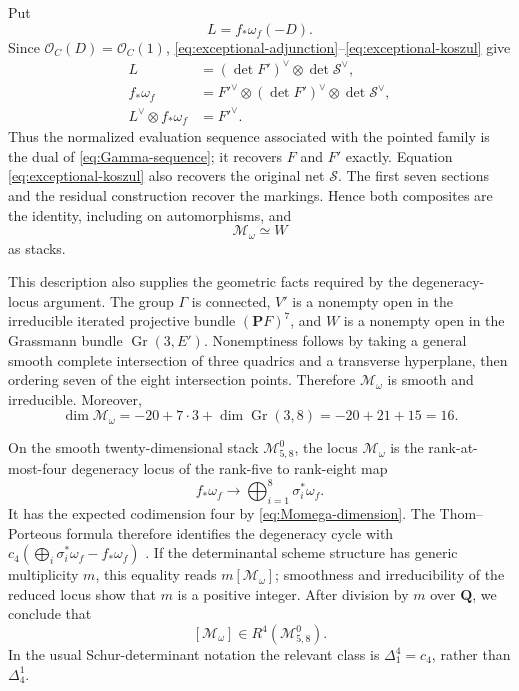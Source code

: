 \documentclass[12pt,reqno]{amsart}
\newcommand{\Q}{\mathbf{Q}}
\newcommand{\M}{\mathcal{M}}
\theoremstyle{definition}
\theoremstyle{remark}
\begin{document}
Put
\begin{equation}\label{eq:exceptional-L}
 L=f_*\omega_f(-D).
\end{equation}
Since $\mathcal O_C(D)=\mathcal O_C(1)$,
\eqref{eq:exceptional-adjunction}--\eqref{eq:exceptional-koszul} give
\begin{equation}\label{eq:exceptional-roundtrip}
 \begin{split}
 L&=(\det F')^\vee\otimes\det\mathcal S^\vee,\\
 f_*\omega_f&=F'^\vee\otimes
 (\det F')^\vee\otimes\det\mathcal S^\vee,\\
 L^\vee\otimes f_*\omega_f&=F'^\vee.
 \end{split}
\end{equation}
Thus the normalized evaluation sequence associated with the pointed family is
the dual of \eqref{eq:Gamma-sequence}; it recovers $F$ and $F'$ exactly.
Equation \eqref{eq:exceptional-koszul} also recovers the original net
$\mathcal S$.  The first seven sections and the residual construction recover
the markings.  Hence both composites are the identity, including on
automorphisms, and
\begin{equation}\label{eq:Momega-W}
 \M_\omega\simeq W
\end{equation}
as stacks.

This description also supplies the geometric facts required by the
degeneracy-locus argument.  The group $\Gamma$ is connected, $V'$ is a
nonempty open in the irreducible iterated projective bundle $(\mathbf P F)^7$,
and $W$ is a nonempty open in the Grassmann bundle
$\operatorname{Gr}(3,E')$.  Nonemptiness follows by taking a general smooth
complete intersection of three quadrics and a transverse hyperplane, then
ordering seven of the eight intersection points.  Therefore $\M_\omega$ is
smooth and irreducible.  Moreover,
\begin{equation}\label{eq:Momega-dimension}
 \dim\M_\omega=-20+7\cdot3+\dim\operatorname{Gr}(3,8)
 =-20+21+15=16.
\end{equation}

On the smooth twenty-dimensional stack $\M^0_{5,8}$, the locus
$\M_\omega$ is the rank-at-most-four degeneracy locus of the rank-five to
rank-eight map
\begin{equation}\label{eq:Momega-degeneracy}
 f_*\omega_f\longrightarrow\bigoplus_{i=1}^8\sigma_i^*\omega_f.
\end{equation}
It has the expected codimension four by \eqref{eq:Momega-dimension}.
The Thom--Porteous formula therefore identifies the degeneracy cycle with
$c_4(\bigoplus_i\sigma_i^*\omega_f-f_*\omega_f)$
\cite[Theorem~14.4(c)]{Fulton}.  If the determinantal scheme structure has
generic multiplicity $m$, this equality reads $m[\M_\omega]$; smoothness and
irreducibility of the reduced locus show that $m$ is a positive integer.
After division by $m$ over $\Q$, we conclude that
\begin{equation}\label{eq:Momega-class}
 [\M_\omega]\in R^4(\M^0_{5,8}).
\end{equation}
In the usual Schur-determinant notation the relevant class is
$\Delta^4_1=c_4$, rather than $\Delta^1_4$.
\end{document}
